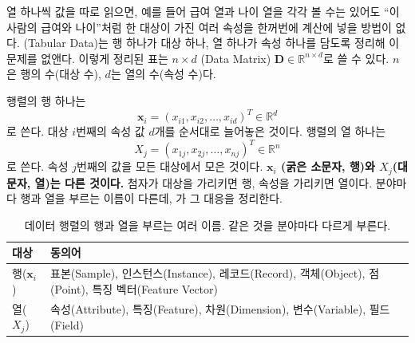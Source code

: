 열 하나씩 값을 따로 읽으면, 예를 들어 급여 열과 나이 열을 각각 볼 수는
있어도 ``이 사람의 급여와 나이''처럼 한 대상이 가진 여러 속성을 한꺼번에
계산에 넣을 방법이 없다. (Tabular Data)는 행 하나가
대상 하나, 열 하나가 속성 하나를 담도록 정리해 이 문제를 없앤다. 이렇게
정리된 표는 $n \times d$ (Data Matrix) $\mathbf{D} \in
\mathbb{R}^{n \times d}$로 쓸 수 있다. $n$은 행의 수(대상 수), $d$는
열의 수(속성 수)다.

행렬의 행 하나는
\[
  \mathbf{x}_i = (x_{i1}, x_{i2}, \dots, x_{id})^T \in \mathbb{R}^d
\]
로 쓴다. 대상 $i$번째의 속성 값 $d$개를 순서대로 늘어놓은 것이다.
행렬의 열 하나는
\[
  X_j = (x_{1j}, x_{2j}, \dots, x_{nj})^T \in \mathbb{R}^n
\]
로 쓴다. 속성 $j$번째의 값을 모든 대상에서 모은 것이다. \textbf{$\mathbf{x}_i$
(굵은 소문자, 행)와 $X_j$(대문자, 열)는 다른 것이다.} 첨자가 대상을
가리키면 행, 속성을 가리키면 열이다. 분야마다 행과 열을 부르는 이름이
다른데, 가 그 대응을 정리한다.

\begin{table}[H]\centering
\caption{데이터 행렬의 행과 열을 부르는 여러 이름. 같은 것을 분야마다
다르게 부른다.}
\label{tab:attr-synonyms}
\begin{tabularx}{\linewidth}{@{}l X@{}}
\toprule
대상 & 동의어 \\
\midrule
행($\mathbf{x}_i$) & 표본(Sample), 인스턴스(Instance), 레코드(Record),
  객체(Object), 점(Point), 특징 벡터(Feature Vector) \\
\midrule
열($X_j$) & 속성(Attribute), 특징(Feature), 차원(Dimension),
  변수(Variable), 필드(Field) \\
\bottomrule
\end{tabularx}
\end{table}

